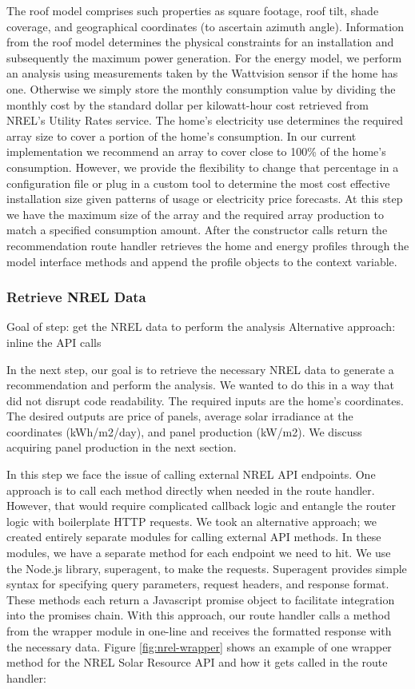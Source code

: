 \documentclass[pageno]{jpaper}
\begin{document}
The roof model comprises such properties as square footage, roof tilt, shade coverage, and geographical coordinates (to ascertain azimuth angle). Information from the roof model determines the physical constraints for an installation and subsequently the maximum power generation. For the energy model, we perform an analysis using measurements taken by the Wattvision sensor if the home has one. Otherwise we simply store the monthly consumption value by dividing the monthly cost by the standard dollar per kilowatt-hour cost retrieved from NREL's Utility Rates service. The home's electricity use determines the required array size to cover a portion of the home's consumption. In our current implementation we recommend an array to cover close to 100\% of the home's consumption. However, we provide the flexibility to change that percentage in a configuration file or plug in a custom tool to determine the most cost effective installation size given patterns of usage or electricity price forecasts. At this step we have the maximum size of the array and the required array production to match a specified consumption amount. 
After the constructor calls return the recommendation route handler retrieves the home and energy profiles through the model interface methods and append the profile objects to the context variable.

\subsubsection{Retrieve NREL Data}
Goal of step: get the NREL data to perform the analysis
Alternative approach: inline the API calls

In the next step, our goal is to retrieve the necessary NREL data to generate a recommendation and perform the analysis. We wanted to do this in a way that did not disrupt code readability. The required inputs are the home's coordinates. The desired outputs are price of panels, average solar irradiance at the coordinates (kWh/m2/day), and panel production (kW/m2). We discuss acquiring panel production in the next section.

In this step we face the issue of calling external NREL API endpoints. One approach is to call each method directly when needed in the route handler. However, that would require complicated callback logic and entangle the router logic with boilerplate HTTP requests. We took an alternative approach; we created entirely separate modules for calling external API methods. In these modules, we have a separate method for each endpoint we need to hit. We use the Node.js library, superagent, to make the requests. Superagent provides simple syntax for specifying query parameters, request headers, and response format. These methods each return a Javascript promise object to facilitate integration into the promises chain. With this approach, our route handler calls a method from the wrapper module in one-line and receives the formatted response with the necessary data. Figure \ref{fig:nrel-wrapper} shows an example of one wrapper method for the NREL Solar Resource API and how it gets called in the route handler:
\end{document}
